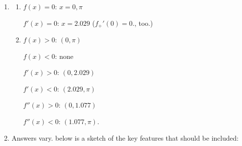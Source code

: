 \documentclass{ximera}
\begin{document}
\begin{enumerate}
\begin{enumerate}
\smallskip



\end{enumerate}

\newpage

\item \begin{enumerate}  \item

\begin{multicols}{2}

 $f(x) = 0$:  $x = 0, \pi$
 
  $f'(x) = 0$: $x = 2.029$ ($f_{+}'(0) = 0$.,  too.)

\end{multicols}

\smallskip

\item  \begin{multicols}{2}

 $f(x) > 0$: $(0, \pi)$
 
  $f(x) < 0$: none

\end{multicols}

\smallskip

\begin{multicols}{2}

 $f'(x) > 0$: $(0, 2.029)$
 
  $f'(x) < 0$: $(2.029, \pi)$

\end{multicols}

\smallskip

\begin{multicols}{2}

 $f''(x) > 0$: $(0, 1.077)$
 
  $f''(x) < 0$: $(1.077, \pi)$.

\end{multicols}

\end{enumerate}

\item Answers vary.  below is a sketch of the key features that should be included:


\begin{center}


\end{center}
\end{enumerate}
\end{document}
